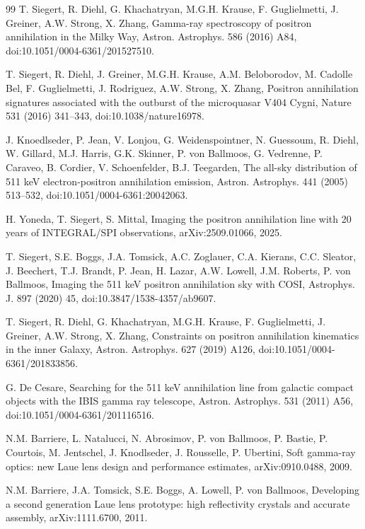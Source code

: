 \documentclass[11pt]{article}
\begin{document}
\begin{thebibliography}{99}
T. Siegert, R. Diehl, G. Khachatryan, M.G.H. Krause, F. Guglielmetti, J. Greiner, A.W. Strong, X. Zhang, Gamma-ray spectroscopy of positron annihilation in the Milky Way, Astron. Astrophys. 586 (2016) A84, doi:10.1051/0004-6361/201527510.

T. Siegert, R. Diehl, J. Greiner, M.G.H. Krause, A.M. Beloborodov, M. Cadolle Bel, F. Guglielmetti, J. Rodriguez, A.W. Strong, X. Zhang, Positron annihilation signatures associated with the outburst of the microquasar V404 Cygni, Nature 531 (2016) 341--343, doi:10.1038/nature16978.

J. Knoedlseder, P. Jean, V. Lonjou, G. Weidenspointner, N. Guessoum, R. Diehl, W. Gillard, M.J. Harris, G.K. Skinner, P. von Ballmoos, G. Vedrenne, P. Caraveo, B. Cordier, V. Schoenfelder, B.J. Teegarden, The all-sky distribution of 511 keV electron-positron annihilation emission, Astron. Astrophys. 441 (2005) 513--532, doi:10.1051/0004-6361:20042063.

H. Yoneda, T. Siegert, S. Mittal, Imaging the positron annihilation line with 20 years of INTEGRAL/SPI observations, arXiv:2509.01066, 2025.

T. Siegert, S.E. Boggs, J.A. Tomsick, A.C. Zoglauer, C.A. Kierans, C.C. Sleator, J. Beechert, T.J. Brandt, P. Jean, H. Lazar, A.W. Lowell, J.M. Roberts, P. von Ballmoos, Imaging the 511 keV positron annihilation sky with COSI, Astrophys. J. 897 (2020) 45, doi:10.3847/1538-4357/ab9607.

T. Siegert, R. Diehl, G. Khachatryan, M.G.H. Krause, F. Guglielmetti, J. Greiner, A.W. Strong, X. Zhang, Constraints on positron annihilation kinematics in the inner Galaxy, Astron. Astrophys. 627 (2019) A126, doi:10.1051/0004-6361/201833856.

G. De Cesare, Searching for the 511 keV annihilation line from galactic compact objects with the IBIS gamma ray telescope, Astron. Astrophys. 531 (2011) A56, doi:10.1051/0004-6361/201116516.

N.M. Barriere, L. Natalucci, N. Abrosimov, P. von Ballmoos, P. Bastie, P. Courtois, M. Jentschel, J. Knodlseder, J. Rousselle, P. Ubertini, Soft gamma-ray optics: new Laue lens design and performance estimates, arXiv:0910.0488, 2009.

N.M. Barriere, J.A. Tomsick, S.E. Boggs, A. Lowell, P. von Ballmoos, Developing a second generation Laue lens prototype: high reflectivity crystals and accurate assembly, arXiv:1111.6700, 2011.


\end{thebibliography}
\end{document}
